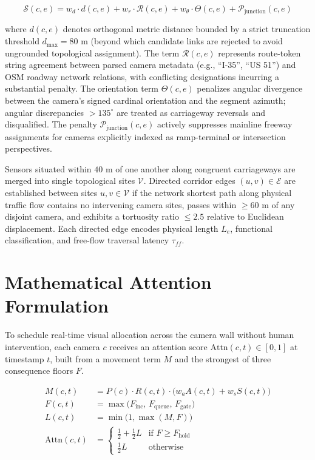 \documentclass[10pt,journal,compsoc]{IEEEtran}
\begin{document}
\begin{equation}
\mathcal{S}(c, e) = w_d \cdot d(c, e) + w_r \cdot \mathcal{R}(c, e) + w_\theta \cdot \Theta(c, e) + \mathcal{P}_{\text{junction}}(c, e)
\label{eq:snapping}
\end{equation}

\noindent where $d(c, e)$ denotes orthogonal metric distance bounded by a strict truncation threshold $d_{\max} = 80\text{ m}$ (beyond which candidate links are rejected to avoid ungrounded topological assignment). The term $\mathcal{R}(c, e)$ represents route-token string agreement between parsed camera metadata (e.g., ``I-35'', ``US 51'') and OSM roadway network relations, with conflicting designations incurring a substantial penalty. The orientation term $\Theta(c, e)$ penalizes angular divergence between the camera's signed cardinal orientation and the segment azimuth; angular discrepancies $> 135^\circ$ are treated as carriageway reversals and disqualified. The penalty $\mathcal{P}_{\text{junction}}(c, e)$ actively suppresses mainline freeway assignments for cameras explicitly indexed as ramp-terminal or intersection perspectives.

Sensors situated within $40\text{ m}$ of one another along congruent carriageways are merged into single topological sites $\mathcal{V}$. Directed corridor edges $(u, v) \in \mathcal{E}$ are established between sites $u, v \in \mathcal{V}$ if the network shortest path along physical traffic flow contains no intervening camera sites, passes within $\ge 60\text{ m}$ of any disjoint camera, and exhibits a tortuosity ratio $\le 2.5$ relative to Euclidean displacement. Each directed edge encodes physical length $L_e$, functional classification, and free-flow traversal latency $\tau_{ff}$.

\section{Mathematical Attention Formulation}
\label{sec:attention}
To schedule real-time visual allocation across the camera wall without human intervention, each camera $c$ receives an attention score $\text{Attn}(c, t) \in [0, 1]$ at timestamp $t$, built from a movement term $M$ and the strongest of three consequence floors $F$.

\begin{align}
M(c,t) &= P(c) \cdot R(c,t) \cdot \big(w_a A(c,t) + w_s S(c,t)\big) \label{eq:movement}\\
F(c,t) &= \max\big(F_{\text{inc}},\, F_{\text{queue}},\, F_{\text{gate}}\big) \\
L(c,t) &= \min\big(1, \max(M, F)\big) \\
\text{Attn}(c,t) &=
\begin{cases}
\tfrac{1}{2} + \tfrac{1}{2} L & \text{if } F \ge F_{\text{hold}} \\
\tfrac{1}{2} L & \text{otherwise}
\end{cases}
\label{eq:attention}
\end{align}
\end{document}

